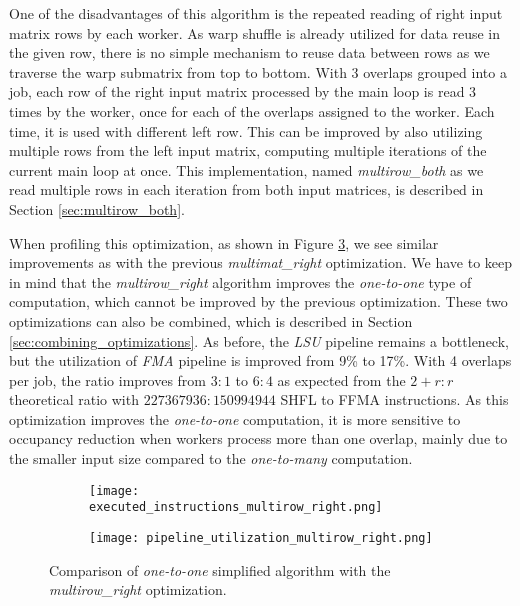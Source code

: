 One of the disadvantages of this algorithm is the repeated reading of right input matrix rows by each worker. As warp shuffle is already utilized for data reuse in the given row, there is no simple mechanism to reuse data between rows as we traverse the warp submatrix from top to bottom. With 3 overlaps grouped into a job, each row of the right input matrix processed by the main loop is read 3 times by the worker, once for each of the overlaps assigned to the worker. Each time, it is used with different left row. This can be improved by also utilizing multiple rows from the left input matrix, computing multiple iterations of the current main loop at once. This implementation, named \textit{multirow\_both} as we read multiple rows in each iteration from both input matrices, is described in Section \ref{sec:multirow_both}.


When profiling this optimization, as shown in Figure \ref{fig:multirow_right_profiling}, we see similar improvements as with the previous \textit{multimat\_right} optimization. We have to keep in mind that the \textit{multirow\_right} algorithm improves the \textit{one-to-one} type of computation, which cannot be improved by the previous optimization. These two optimizations can also be combined, which is described in Section \ref{sec:combining_optimizations}. As before, the \textit{LSU} pipeline remains a bottleneck, but the utilization of \textit{FMA} pipeline is improved from 9\% to 17\%. With 4 overlaps per job, the ratio improves from $3 : 1$ to $6 : 4$ as expected from the $2 + r : r$ theoretical ratio with $227 367 936 : 150 994 944$ SHFL to FFMA instructions. As this optimization improves the \textit{one-to-one} computation, it is more sensitive to occupancy reduction when workers process more than one overlap, mainly due to the smaller input size compared to the \textit{one-to-many} computation.

\begin{figure}[ht]
	\centering	
	\begin{subfigure}{\textwidth}
		\centering
		\texttt{[image: executed\_instructions\_multirow\_right.png]}
		\label{fig:executed_instructions_multirow_right}
	\end{subfigure}
	\hfill
	\begin{subfigure}{\textwidth}
		\centering
		\texttt{[image: pipeline\_utilization\_multirow\_right.png]}
		\label{fig:pipeline_utilization_multirow_right}
	\end{subfigure}
	
	\caption{Comparison of \textit{one-to-one} simplified algorithm with the \textit{multirow\_right} optimization.}
	\label{fig:multirow_right_profiling}
\end{figure}

